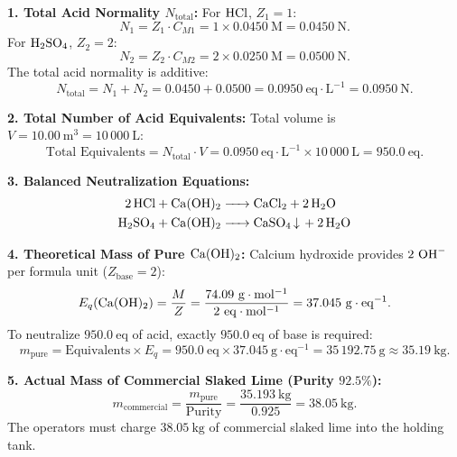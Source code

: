 \begin{solution}
\textbf{1. Total Acid Normality $N_{\text{total}}$:}
For $\ce{HCl}$, $Z_1 = 1$:
\[
N_1 = Z_1 \cdot C_{M1} = 1 \times 0.0450\ \mathrm{M} = 0.0450\ \mathrm{N}.
\]
For $\ce{H2SO4}$, $Z_2 = 2$:
\[
N_2 = Z_2 \cdot C_{M2} = 2 \times 0.0250\ \mathrm{M} = 0.0500\ \mathrm{N}.
\]
The total acid normality is additive:
\[
N_{\text{total}} = N_1 + N_2 = 0.0450 + 0.0500 = \mathbf{0.0950\ \mathrm{eq\cdot L^{-1}} = 0.0950\ \mathrm{N}}.
\]

\textbf{2. Total Number of Acid Equivalents:}
Total volume is $V = 10.00\ \mathrm{m^3} = 10\,000\ \mathrm{L}$:
\[
\text{Total Equivalents} = N_{\text{total}} \cdot V = 0.0950\ \mathrm{eq\cdot L^{-1}} \times 10\,000\ \mathrm{L} = \mathbf{950.0\ \mathrm{eq}}.
\]

\textbf{3. Balanced Neutralization Equations:}
\begin{align*}
\ce{2 HCl + Ca(OH)2 &-> CaCl2 + 2 H2O} \\
\ce{H2SO4 + Ca(OH)2 &-> CaSO4 v + 2 H2O}
\end{align*}

\textbf{4. Theoretical Mass of Pure $\ce{Ca(OH)2}$:}
Calcium hydroxide provides $2\ \ce{OH-}$ per formula unit ($Z_{\text{base}} = 2$):
\[
E_q(\ce{Ca(OH)2}) = \frac{M}{Z} = \frac{74.09\ \mathrm{g\cdot mol^{-1}}}{2\ \mathrm{eq\cdot mol^{-1}}} = 37.045\ \mathrm{g\cdot eq^{-1}}.
\]
To neutralize $950.0\ \mathrm{eq}$ of acid, exactly $950.0\ \mathrm{eq}$ of base is required:
\[
m_{\text{pure}} = \text{Equivalents} \times E_q = 950.0\ \mathrm{eq} \times 37.045\ \mathrm{g\cdot eq^{-1}} = 35\,192.75\ \mathrm{g} \approx \mathbf{35.19\ \mathrm{kg}}.
\]

\textbf{5. Actual Mass of Commercial Slaked Lime (Purity $92.5\%$):}
\[
m_{\text{commercial}} = \frac{m_{\text{pure}}}{\text{Purity}} = \frac{35.193\ \mathrm{kg}}{0.925} = \mathbf{38.05\ \mathrm{kg}}.
\]
The operators must charge $\mathbf{38.05\ \mathrm{kg}}$ of commercial slaked lime into the holding tank.
\end{solution}
